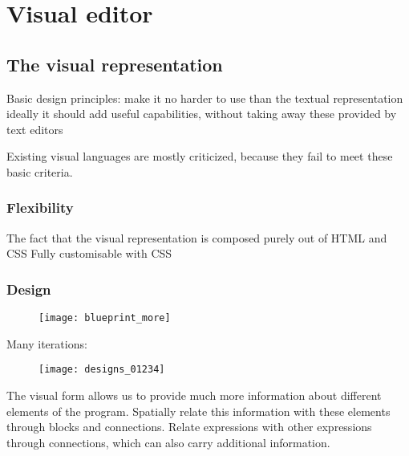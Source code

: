 \section{Visual editor}
\subsection{The visual representation}
Basic design principles:
make it no harder to use than the textual representation
ideally it should add useful capabilities, without taking away these provided by text editors

Existing visual languages are mostly criticized, because they fail to meet these basic criteria.

\subsubsection{Flexibility}
The fact that the visual representation is composed purely out of HTML and CSS 
Fully customisable with CSS

\subsubsection{Design}
\begin{figure}[h!]
\centering
\texttt{[image: blueprint\_more]}
\caption{}
\label{fig:blueprint_more}
\end{figure}

Many iterations:

\begin{figure}[h!]
\centering
\texttt{[image: designs\_01234]}
\caption{}
\label{fig:designs_01234}
\end{figure}

The visual form allows us to provide much more information about different elements of the program.
Spatially relate this information with these elements through blocks and connections.
Relate expressions with other expressions through connections, which can also carry additional information.

